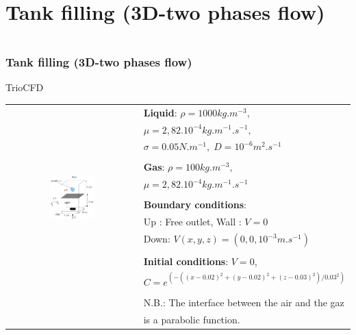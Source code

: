 \documentclass[10pt]{beamer}
\begin{document}
\section{Tank filling (3D-two phases flow)}
\begin{frame}
\begin{columns}[c] 
\tableofcontents[sections={1-7},currentsection, currentsubsection]
\tableofcontents[sections={8-13},currentsection, currentsubsection]
\end{columns}
\end{frame}
\begin{frame}
\frametitle{Tank filling (3D-two phases flow)}
\begin{block}{TrioCFD}


\begin{tabular}{cl}
\multirow{14}{*}{\includegraphics[width=0.35\textwidth]{PICTURES/tank3D}}
 & \textbf{Liquid}: $\rho=1000kg.m^{-3},$ \tabularnewline
 & $\mu=2,82.10^{-4}kg.m^{-1}.s^{-1},$ \tabularnewline
 & $\sigma=0.05N.m^{-1},\; D=10^{-6}m^{2}.s^{-1}$\tabularnewline
 & \tabularnewline
 & \textbf{Gas}: $\rho=100kg.m^{-3},$\tabularnewline
 & $\mu=2,82.10^{-4}kg.m^{-1}.s^{-1}$\tabularnewline
 & \tabularnewline
 & \textbf{Boundary conditions}:  \tabularnewline
 & Up : Free outlet, \hspace{0.5cm} Wall : $V=0$ \tabularnewline
 & Down: $V(x,y,z)=(0,0,10^{-3}m.s^{-1})$\tabularnewline
 & \tabularnewline
 & \textbf{Initial conditions}: $V=0$, \tabularnewline
 & $C=e^{(-((x-0.02)^{2}+(y-0.02)^{2}+(z-0.03)^{2})/0.03^{2})}$ \tabularnewline
 & \tabularnewline
 & N.B.: The interface between the air and the gaz\tabularnewline
 & is a parabolic function.\tabularnewline
\end{tabular}

\end{block}
\end{frame}
\end{document}
